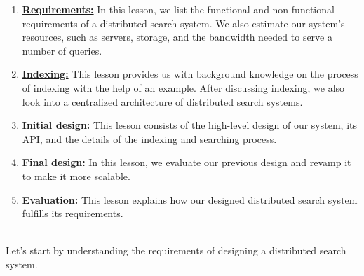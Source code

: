 \begin{enumerate}
\item
\protect{}\label{PescbaozFXHv9bdbGk3iv}
\href{https://www.educative.io/courses/grokking-the-system-design-interview/requirements-of-a-distributed-search-systems-design}{\textbf{Requirements:}} In this lesson, we list the functional and non-functional requirements of a distributed search system. We also estimate our system's resources, such as servers, storage, and the bandwidth needed to serve a number of queries.
\item
\protect{}\label{y-NhRRh39Re8_Uy6PMH1T}
\href{https://www.educative.io/courses/grokking-the-system-design-interview/indexing-in-a-distributed-search}{\textbf{Indexing:}} This lesson provides us with background knowledge on the process of indexing with the help of an example. After discussing indexing, we also look into a centralized architecture of distributed search systems.
\item
\protect{}\label{I_SQQ8a2cppduvKuFNPKc}
\href{https://www.educative.io/courses/grokking-the-system-design-interview/design-of-a-distributed-search}{\textbf{Initial design:}} This lesson consists of the high-level design of our system, its API, and the details of the indexing and searching process.
\item
\protect{}\label{S9zclZXmGsl3jH8348v2S}
\href{https://www.educative.io/courses/grokking-the-system-design-interview/scaling-search-and-indexing}{\textbf{Final design:}} In this lesson, we evaluate our previous design and revamp it to make it more scalable.
\item
\protect{}\label{HsdcZBXfhl4GQ_FeKviWV}
\href{https://www.educative.io/courses/grokking-the-system-design-interview/evaluation-of-a-distributed-searchs-design}{\textbf{Evaluation:}} This lesson explains how our designed distributed search system fulfills its requirements.
\end{enumerate}
\\
Let's start by understanding the requirements of designing a distributed search system.

